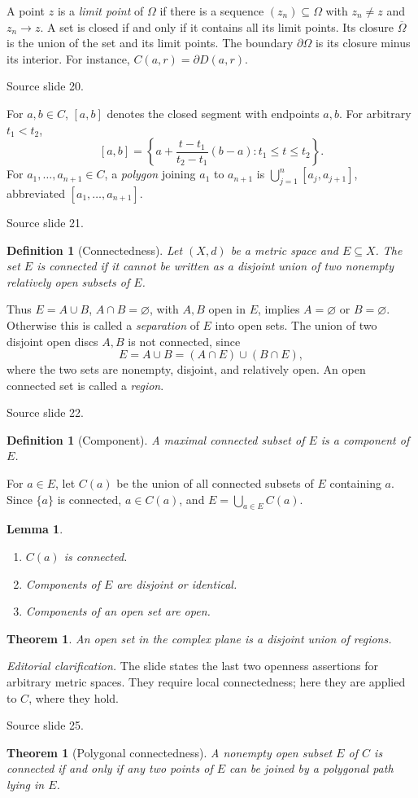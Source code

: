 \documentclass[10pt,letterpaper,twoside,openright]{amsbook}
\numberwithin{equation}{subsection}
\theoremstyle{sea-plain}
\newtheorem{theorem}[subsection]{Theorem}
\newtheorem{lemma}[subsection]{Lemma}
\theoremstyle{sea-definition}
\newtheorem{definition}[subsection]{Definition}
\theoremstyle{sea-exercise}
\newcommand{\RR}{\mathbb{R}}
\newcommand{\CC}{\mathbb{C}}
\newcommand{\DD}{\mathbb{D}}
\newcommand{\HH}{\mathbb{H}}
\newcommand{\Chat}{\mathbb{C}_{\infty}}
\def\CC{C}\def\RR{R}\def\DD{D}\def\HH{H}\def\Chat{C infinity}}
\newcommand{\src}[1]{\par\smallskip\noindent
 {\scriptsize\sffamily\color{SoftWhite}Source slide #1.}\par\nopagebreak\smallskip}
\newcommand{\editorial}[1]{\par\smallskip\noindent
 {\small\textit{Editorial clarification.} #1}\par\smallskip}
\begin{document}
A point $z$ is a \emph{limit point} of $\Omega$ if there is a sequence
$(z_n)\subseteq\Omega$ with $z_n\ne z$ and $z_n\to z$.
A set is closed if and only if it contains all its limit points. Its closure
$\overline\Omega$ is the union of the set and its limit points.
The boundary $\partial\Omega$ is its closure minus its interior.
For instance, $C(a,r)=\partial D(a,r)$.
\src{20}
For $a,b\in\CC$, $[a,b]$ denotes the closed segment with endpoints $a,b$.
For arbitrary $t_1<t_2$,
\[
 [a,b]=\left\{a+\frac{t-t_1}{t_2-t_1}(b-a):t_1\leq t\leq t_2\right\}.
\]
For $a_1,\ldots,a_{n+1}\in\CC$, a \emph{polygon} joining $a_1$ to
$a_{n+1}$ is $\bigcup_{j=1}^n[a_j,a_{j+1}]$, abbreviated
$[a_1,\ldots,a_{n+1}]$.
\src{21}
\begin{definition}[Connectedness]
Let $(X,d)$ be a metric space and $E\subseteq X$. The set $E$ is connected
if it cannot be written as a disjoint union of two nonempty relatively open
subsets of $E$.
\end{definition}
Thus $E=A\cup B$, $A\cap B=\varnothing$, with $A,B$ open in $E$, implies
$A=\varnothing$ or $B=\varnothing$. Otherwise this is called a
\emph{separation} of $E$ into open sets. The union of two disjoint open
discs $A,B$ is not connected, since
\[
 E=A\cup B=(A\cap E)\cup(B\cap E),
\]
where the two sets are nonempty, disjoint, and relatively open.
An open connected set is called a \emph{region}.
\src{22}
\begin{definition}[Component]
A maximal connected subset of $E$ is a component of $E$.
\end{definition}
For $a\in E$, let $C(a)$ be the union of all connected subsets of $E$
containing $a$. Since $\{a\}$ is connected, $a\in C(a)$, and
$E=\bigcup_{a\in E}C(a)$.
\begin{lemma}
\begin{enumerate}[label=(\roman*)]
\item $C(a)$ is connected.
\item Components of $E$ are disjoint or identical.
\item Components of an open set are open.
\end{enumerate}
\end{lemma}
\begin{theorem}
An open set in the complex plane is a disjoint union of regions.
\end{theorem}
\editorial{The slide states the last two openness assertions for arbitrary
metric spaces. They require local connectedness; here they are applied to
$\CC$, where they hold.}
\src{25}
\begin{theorem}[Polygonal connectedness]
A nonempty open subset $E$ of $\CC$ is connected if and only if any two
points of $E$ can be joined by a polygonal path lying in $E$.
\end{theorem}
\end{document}
